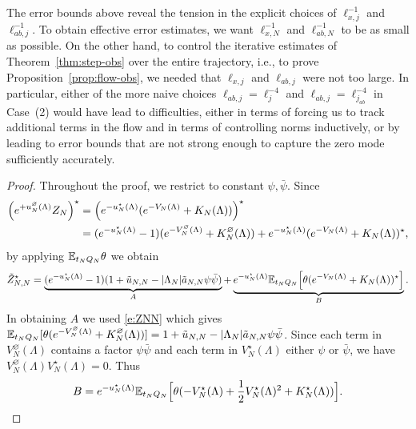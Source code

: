 \documentclass[11pt]{amsart}
\numberwithin{equation}{section}
\numberwithin{theorem}{section}
\newcommand{\1}{{\bf 1}}
\newcommand{\obs}{\star}
\newcommand{\Vbulk}{V^\varnothing}
\newcommand{\Kbulk}{K^\varnothing}
\newcommand{\ellxj}{\ell_{x,j}}
\newcommand{\ellabj}{\ell_{ab,j}}
\newcommand{\ellxN}{\ell_{x,N}}
\newcommand{\ellabN}{\ell_{ab,N}}
\begin{document}
The error bounds above reveal the tension in the explicit choices of
$\ellxj^{-1}$ and $\ellabj^{-1}$.  To obtain effective error
estimates, we want $\ellxN^{-1}$ and $\ellabN^{-1}$ to be as small as
possible.  On the other hand, to control the iterative estimates of
Theorem~\ref{thm:step-obs} over the entire trajectory, i.e., to prove
Proposition~\ref{prop:flow-obs}, we needed that $\ell_{x,j}$ and
$\ell_{ab,j}$ were not too large.  In particular, either of the more
naive choices $\ell_{ab,j}=\ell_{j}^{-4}$ and
  $\ell_{ab,j} = \ell_{j_{ab}}^{-4}$ in Case~(2) would have lead to
difficulties, either in terms of forcing us to track additional terms
in the flow and in terms of controlling norms inductively, or
by leading to error bounds that are not strong enough to capture
the zero mode sufficiently accurately.

\begin{proof}
  Throughout the proof, we restrict to constant $\psi,\bar\psi$.
  Since  
  \begin{align}
    \pa{e^{+u_N^\varnothing(\Lambda)}Z_N}^\obs
    &= \pa{e^{-u_N^\obs(\Lambda)}(e^{-V_N(\Lambda)}+K_N(\Lambda))}^\obs
      \nnb
    &=
    (e^{-u_N^\obs(\Lambda)}-1)(e^{-\Vbulk_N(\Lambda)}+\Kbulk_N(\Lambda))
      + e^{-u_N^\obs(\Lambda)}(e^{-V_N(\Lambda)}+K_N(\Lambda))^\obs,
  \end{align}
  by applying $\mathbb{E}_{t_NQ_N}\theta$ we obtain
  \begin{multline}
    \tilde Z_{N,N}^\obs = \underbrace{(e^{-u^\obs_N(\Lambda)}-1)(1+\tilde u_{N,N}-|\Lambda_N|\tilde a_{N,N}\psi\bar\psi)}_{A}
    + \underbrace{e^{-u_N^\obs(\Lambda)}\E_{t_NQ_N}\qB{\theta(e^{-V_N(\Lambda)}+K_N(\Lambda))^\obs}}_{B} 
    .
  \end{multline}
  In obtaining $A$
  we used \eqref{e:ZNN} which gives $\mathbb{E}_{t_NQ_N}[\theta (e^{-V_N^\varnothing(\Lambda)}+K_N^\varnothing(\Lambda))]= 1+\tilde u_{N,N}-|\Lambda_N|\tilde a_{N,N}\psi\bar\psi$.
  Since each term in $V_N^\varnothing(\Lambda)$ contains a factor $\psi\bar\psi$
  and each term in $V_N^\obs(\Lambda)$ either $\psi$ or $\bar\psi$,
  we have $V_N^\varnothing(\Lambda)V_N^\obs(\Lambda)=0$.
  Thus
  \begin{equation}
    B = e^{-u_N^\obs(\Lambda)}\E_{t_NQ_N}\qB{\theta(-V_N^\obs(\Lambda)+\frac12 V_N^\obs(\Lambda)^2+K_N^\obs(\Lambda))}
    .
  \end{equation}


\end{proof}
\end{document}
